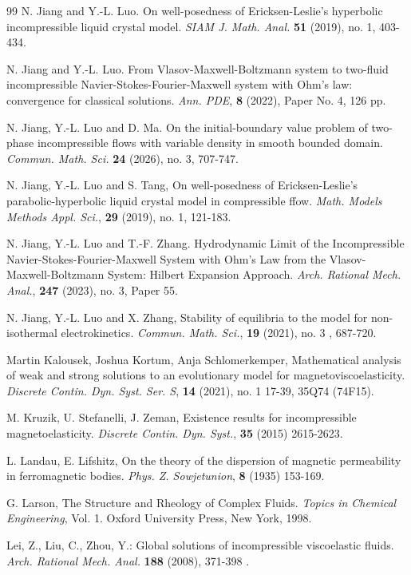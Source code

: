 \documentclass[reqno,11pt]{amsart}
\numberwithin{equation}{section}
\begin{document}
\begin{thebibliography}{99}
 N. Jiang and Y.-L. Luo. On well-posedness of Ericksen-Leslie's hyperbolic incompressible liquid crystal model. {\em SIAM J. Math. Anal.} {\bf 51} (2019), no. 1, 403-434.
    
 N. Jiang and Y.-L. Luo. From Vlasov-Maxwell-Boltzmann system to two-fluid incompressible Navier-Stokes-Fourier-Maxwell system with Ohm’s law: convergence for classical solutions. {\em Ann. PDE}, {\bf 8} (2022), Paper No. 4, 126 pp. 

 N. Jiang, Y.-L. Luo and D. Ma. On the initial-boundary value problem of two-phase incompressible flows with variable density in smooth bounded domain. {\em Commun. Math. Sci.} {\bf 24} (2026), no. 3, 707-747.

N. Jiang, Y.-L. Luo and S. Tang, On well-posedness of Ericksen-Leslie’s parabolic-hyperbolic liquid crystal
model in compressible ffow. \emph{Math. Models Methods Appl. Sci.}, {\bf29} (2019), no. 1, 121-183.

 N. Jiang, Y.-L. Luo and T.-F. Zhang. Hydrodynamic Limit of the Incompressible Navier-Stokes-Fourier-Maxwell System with Ohm’s Law from the Vlasov-Maxwell-Boltzmann System: Hilbert Expansion Approach. {\em Arch. Rational Mech. Anal.}, {\bf 247} (2023), no. 3, Paper 55. 

N. Jiang, Y.-L. Luo and X. Zhang, Stability of equilibria to the model for non-isothermal electrokinetics. \emph{Commun. Math. Sci.}, {\bf19} (2021), no. 3 , 687-720.

 Martin Kalousek, Joshua Kortum, Anja Schlomerkemper, Mathematical analysis of weak and strong solutions to an evolutionary model for magnetoviscoelasticity. {\em Discrete Contin. Dyn. Syst. Ser. S}, \textbf{14} (2021), no. 1  17-39, 35Q74 (74F15).

 M. Kruzik, U. Stefanelli, J. Zeman, Existence results for incompressible magnetoelasticity. {\em Discrete Contin. Dyn. Syst.}, \textbf{35} (2015) 2615-2623.

 L. Landau, E. Lifshitz, On the theory of the dispersion of magnetic permeability in ferromagnetic bodies. {\em Phys. Z. Sowjetunion}, \textbf{8} (1935) 153-169.

 G. Larson, The Structure and Rheology of Complex Fluids. \textit{Topics in Chemical Engineering}, Vol. 1. Oxford University Press, New York, 1998.

 Lei, Z., Liu, C., Zhou, Y.: Global solutions of incompressible viscoelastic fluids. \textit{Arch. Rational Mech. Anal.} \textbf{188} (2008), 371-398 .


\end{thebibliography}
\end{document}
